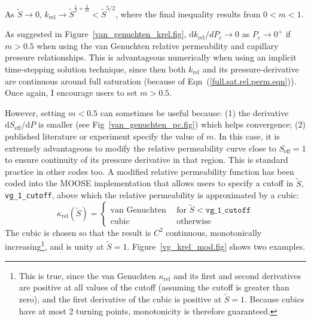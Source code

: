 \documentclass[]{scrreprt}
\begin{document}
As $\tilde{S}\rightarrow 0$, $k_{\mathrm{rel}} \rightarrow \tilde{S}^{\frac{1}{2} +
  \frac{2}{m}} < \tilde{S}^{5/2}$, where the final inequality results from
$0<m<1$.

As suggested in Figure~\ref{van_genuchten_krel.fig},
$\mathrm{d}k_{\mathrm{rel}}/d P_{c} \rightarrow 0$ as
$P_{c}\rightarrow 0^{+}$ if $m>0.5$ when using the van Genuchten
relative permeability and capillary pressure relationships.  This is
advantageous numerically when using an implicit time-stepping solution
technique, since then both $k_{\mathrm{rel}}$ and its
pressure-derivative are continuous around full saturation (because of
Eqn~(\ref{full.sat.rel.perm.eqn})).  Once again, I encourage users to
set $m>0.5$.

However, setting $m<0.5$ can sometimes be useful because: (1) the
derivative $\mathrm{d}S_{\mathrm{eff}}/\mathrm{d} P$ is smaller (see
Fig~\ref{van_genuchten_pc.fig}) which helps convergence; (2) published
literature or experiment specify the value of $m$.  In this case, it
is extremely advantageous to modify the relative permeability curve
close to $S_{\mathrm{eff}}=1$ to ensure continuity of its pressure
derivative in that region.  This is standard practice in other codes
too.  A modified relative permeability function has been coded into
the MOOSE implementation that allows users to specify a cutoff in $\tilde{S}$, {\tt
  vg\_1\_cutoff}, above which the relative permeability is
approximated by a cubic:
\begin{equation}
\kappa_{\mathrm{rel}}(\tilde{S}) = \left\{
\begin{array}{ll}
\mbox{van Genuchten} & \ \ \mbox{for }
\tilde{S}<\mathtt{vg\_1\_cutoff} \\
\mbox{cubic} & \ \ \mbox{otherwise}
\end{array}
\right.
\label{eqn.mod_vg_1}
\end{equation}
The cubic is chosen so that the result is $C^{2}$ continuous,
monotonically increasing\footnote{This is true, since the van
  Genuchten $\kappa_{\mathrm{rel}}$ and its first and second
  derivatives are positive at all values of the cutoff (assuming the
  cutoff is greater than zero), and the first derivative of the cubic
  is positive at $\tilde{S}=1$.  Because cubics have at most 2 turning
  points, monotonicity is therefore guaranteed.}, and is unity at
$\tilde{S}=1$.  Figure~\ref{vg_krel_mod.fig} shows two examples.
\end{document}
